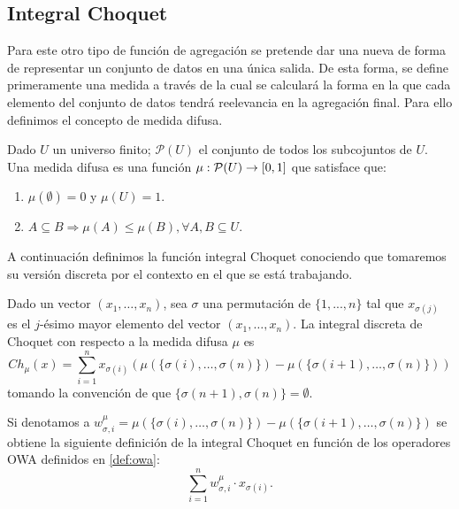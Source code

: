 \documentclass[main]{subfiles}
\begin{document}
\subsection{Integral Choquet}
Para este otro tipo de función \cite{art:choquet, art:sugenochoquet} de agregación se pretende dar una nueva de forma de representar un conjunto de datos en una única salida. De esta forma, se define primeramente una medida a través de la cual se calculará la forma en la que cada elemento del conjunto de datos tendrá reelevancia en la agregación final. Para ello definimos el concepto de medida difusa.
\begin{definition}\label{def:medidadifusa}
Dado $U$ un universo finito; $\mathcal{P}(U)$ el conjunto de todos los subcojuntos de $U$. Una medida difusa es una función $\mu:\mathcal{P}(U)\rightarrow[0,1]$ que satisface que:
\begin{enumerate}
	\item $\mu(\emptyset)=0$ y $\mu(U)=1$.
	\item $A\subseteq B \Rightarrow \mu(A)\leq\mu (B), \forall A, B \subseteq U$.
\end{enumerate}
\end{definition}

A continuación definimos la función integral Choquet conociendo que tomaremos su versión discreta por el contexto en el que se está trabajando.

\begin{definition}\label{def:choquet}
Dado un vector $(x_1,\dots,x_n)$, sea $\sigma$ una permutación de $\{1,...,n\}$ tal que $x_{\sigma(j)}$ es el $j$-ésimo mayor elemento del vector $(x_{1},\dots,x_{n})$. La integral discreta de Choquet con respecto a la medida difusa $\mu$ es
$$Ch_{\mu}(x)=\sum_{i=1}^{n}x_{\sigma(i)}(\mu(\{\sigma(i),\dots,\sigma(n)\})-\mu(\{\sigma(i+1),\dots,\sigma(n)\}))$$
tomando la convención de que $\{\sigma(n+1),\sigma(n)\}=\emptyset$.
\end{definition}

\begin{proposition}\label{prop:choque2owa}
Si denotamos a $w_{\sigma, i}^{\mu} = \mu(\{\sigma(i),\dots,\sigma(n)\})-\mu(\{\sigma(i+1),\dots,\sigma(n)\})$ se obtiene la siguiente definición de la integral Choquet en función de los operadores OWA definidos en \ref{def:owa}:
$$\sum_{i=1}^{n} w_{\sigma, i}^{\mu} \cdot x_{\sigma(i)}.$$
\end{proposition}
\end{document}
